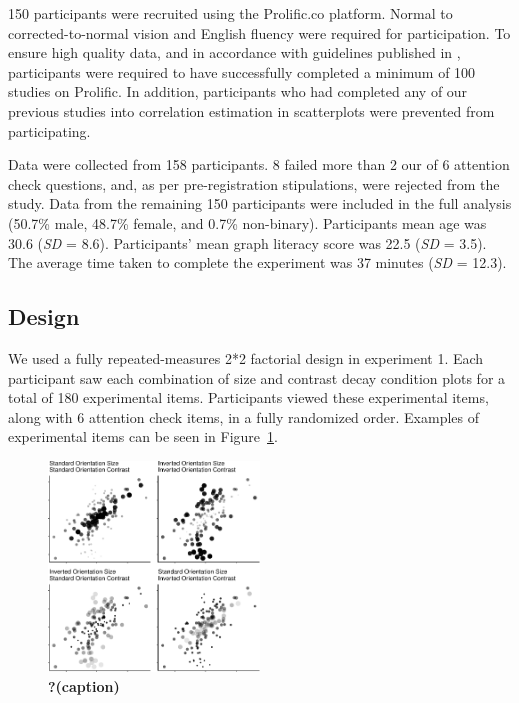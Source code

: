 \documentclass[manuscript, review, anonymous, screen]{acmart}
\begin{document}
150 participants were recruited using the Prolific.co platform. Normal
to corrected-to-normal vision and English fluency were required for
participation. To ensure high quality data, and in accordance with
guidelines published in \citet{peer_2021}, participants were required to
have successfully completed a minimum of 100 studies on Prolific. In
addition, participants who had completed any of our previous studies
into correlation estimation in scatterplots \citep[and a previous
pre-study]{strain_2023, strain_2023b} were prevented from participating.

Data were collected from 158 participants. 8 failed more than 2 our of 6
attention check questions, and, as per pre-registration stipulations,
were rejected from the study. Data from the remaining 150 participants
were included in the full analysis (50.7\% male, 48.7\% female, and
0.7\% non-binary). Participants mean age was 30.6 (\emph{SD} = 8.6).
Participants' mean graph literacy score was 22.5 (\emph{SD} = 3.5). The
average time taken to complete the experiment was 37 minutes (\emph{SD}
= 12.3).

\hypertarget{sec-design}{%
\subsection{Design}\label{sec-design}}

We used a fully repeated-measures 2*2 factorial design in experiment 1.
Each participant saw each combination of size and contrast decay
condition plots for a total of 180 experimental items. Participants
viewed these experimental items, along with 6 attention check items, in
a fully randomized order. Examples of experimental items can be seen in
Figure~\ref{fig-examples}.

\begin{figure}

\includegraphics[width=0.5\textwidth,height=\textheight]{size_and_contrast_new_files/figure-pdf/fig-examples-1.pdf} \hfill{}

\caption{\label{fig-examples}\textbf{?(caption)}}

\end{figure}
\end{document}
